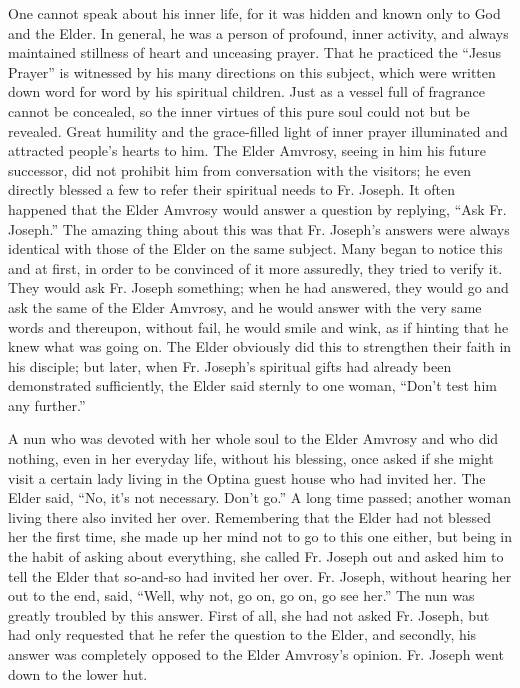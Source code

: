 One cannot speak about his inner life, for it was hidden and known only to God and the Elder. In general, he was a person of profound, inner activity, and always maintained stillness of heart and unceasing prayer. That he practiced the ``Jesus Prayer'' is witnessed by his many directions on this subject, which were written down word for word by his spiritual children. Just as a vessel full of fragrance cannot be concealed, so the inner virtues of this pure soul could not but be revealed. Great humility and the grace-filled light of inner prayer illuminated and attracted people's hearts to him. The Elder Amvrosy, seeing in him his future successor, did not prohibit him from conversation with the visitors; he even directly blessed a few to refer their spiritual needs to Fr. Joseph. It often happened that the Elder Amvrosy would answer a question by replying, ``Ask Fr. Joseph.'' The amazing thing about this was that Fr. Joseph's answers were always identical with those of the Elder on the same subject. Many began to notice this and at first, in order to be convinced of it more assuredly, they tried to verify it. They would ask Fr. Joseph something; when he had answered, they would go and ask the same of the Elder Amvrosy, and he would answer with the very same words and thereupon, without fail, he would smile and wink, as if hinting that he knew what was going on. The Elder obviously did this to strengthen their faith in his disciple; but later, when Fr. Joseph's spiritual gifts had already been demonstrated sufficiently, the Elder said sternly to one woman, ``Don't test him any further.''

A nun who was devoted with her whole soul to the Elder Amvrosy and who did nothing, even in her everyday life, without his blessing, once asked if she might visit a certain lady living in the Optina guest house who had invited her. The Elder said, ``No, it's not necessary. Don't go.'' A long time passed; another woman living there also invited her over. Remembering that the Elder had not blessed her the first time, she made up her mind not to go to this one either, but being in the habit of asking about everything, she called Fr. Joseph out and asked him to tell the Elder that so-and-so had invited her over. Fr. Joseph, without hearing her out to the end, said, ``Well, why not, go on, go on, go see her.'' The nun was greatly troubled by this answer. First of all, she had not asked Fr. Joseph, but had only requested that he refer the question to the Elder, and secondly, his answer was completely opposed to the Elder Amvrosy's opinion. Fr. Joseph went down to the lower hut.

